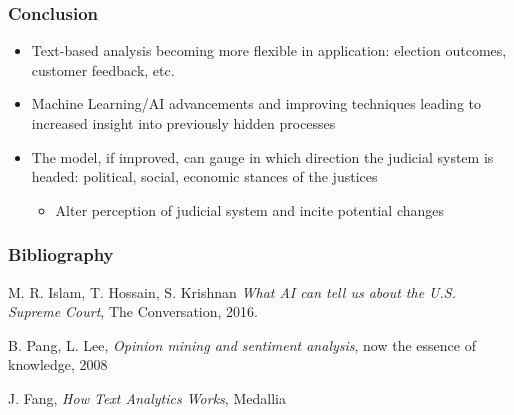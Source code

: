 \documentclass{beamer}
\begin{document}
\begin{frame}
\frametitle{Conclusion}

\begin{itemize}
	\item Text-based analysis becoming more flexible in application: election outcomes, customer feedback, etc.
	\item Machine Learning/AI advancements and improving techniques leading to increased insight into previously hidden processes
	\item The model, if improved, can gauge in which direction the judicial system is headed: political, social, economic stances of the justices
		\begin{itemize}
			\item Alter perception of judicial system and incite potential changes
		\end{itemize}
\end{itemize}


\end{frame}




\begin{frame}
\frametitle{Bibliography}
\footnotesize{
\begin{thebibliography}{9}

M. R. Islam, T. Hossain, S. Krishnan \emph{What AI can tell us about the U.S. Supreme Court}, The Conversation, 2016.

 B. Pang, L. Lee, \emph{Opinion mining and sentiment analysis}, now the essence of knowledge, 2008

 J. Fang, \emph{How Text Analytics Works},  Medallia

\end{thebibliography}

}
\end{frame}


\end{document}
